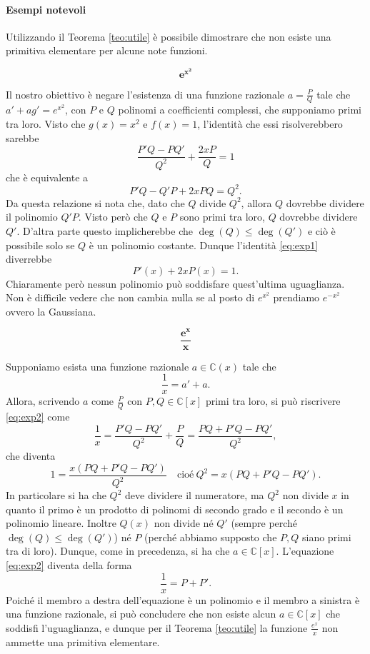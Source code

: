 \documentclass[10pt,oneside]{article}
\theoremstyle{definition}
\theoremstyle{plain}
\theoremstyle{definition}
\theoremstyle{plain}
\theoremstyle{plain}
\newcommand{\C}{\mathbb{C}}
\begin{document}
\paragraph{Esempi notevoli}

Utilizzando il Teorema \ref{teo:utile} è possibile dimostrare che non esiste una primitiva elementare per alcune note funzioni.


 

\[ \bm{e^{x^2}} \]


Il nostro obiettivo è negare l'esistenza di una funzione razionale $a=\frac{P}{Q}$ tale che $a'+ag'=e^{x^2}$, con $P$ e $Q$ polinomi a coefficienti complessi, che supponiamo primi tra loro. Visto che $g(x)=x^2$ e $f(x)=1$, l'identità che essi risolverebbero sarebbe
\[\frac{P'Q-PQ'}{Q^2}+\frac{2xP}{Q}=1 \]
che è equivalente a 
\begin{equation}\label{eq:exp1}
P'Q-Q'P+2xPQ=Q^2. \end{equation}
Da questa relazione si nota che, dato che $Q$ divide $Q^2$, allora $Q$ dovrebbe dividere il polinomio $Q'P$. Visto però che $Q$ e $P$ sono primi tra loro, $Q$ dovrebbe dividere $Q'$. D'altra parte questo implicherebbe che $\deg(Q)\leq\deg(Q')$ e ciò è possibile solo se $Q$ è un polinomio costante. Dunque l'identità \eqref{eq:exp1} diverrebbe
\[P'(x)+2xP(x)=1. \]
Chiaramente però nessun polinomio può soddisfare quest'ultima uguaglianza.
Non è difficile vedere che non cambia nulla se al posto di $e^{x^2}$ prendiamo $e^{-x^2}$ ovvero la Gaussiana.


\[ \bm{\frac{e^x}{x}} \]

Supponiamo esista una funzione razionale $a \in \C(x)$ tale che
\begin{equation}\label{eq:exp2}
    \frac{1}{x}=a'+a .
\end{equation} 
Allora, scrivendo $a$ come $\frac{P}{Q}$ con $P,Q \in \C[x]$ primi tra loro, si può riscrivere \eqref{eq:exp2} come
\[\frac{1}{x}= \frac{P'Q-PQ'}{Q^2}+\frac{P}{Q}= \frac{PQ+P'Q-PQ'}{Q^2}, \]
che diventa
\[ 1 = \frac{x(PQ+P'Q-PQ')}{Q^2} \quad \text{cioé} \ Q^2= x(PQ+P'Q-PQ') . \]
In particolare si ha che $Q^2$ deve dividere il numeratore, ma $Q^2$ non divide $x$ in quanto il primo è un prodotto di polinomi di secondo grado e il secondo è un polinomio lineare. Inoltre $Q(x)$ non divide né $Q'$ (sempre perché $\deg(Q)\le \deg(Q') $) né $P$ (perché abbiamo supposto che $P,Q$ siano primi tra di loro). Dunque, come in precedenza, si ha che $a \in \C[x]$. L'equazione \eqref{eq:exp2}  diventa della forma
\[\frac{1}{x}=P+P'. \]
Poiché il membro a destra dell'equazione è un polinomio e il membro a sinistra è una funzione razionale, si può concludere che non esiste alcun $a \in \C[x]$ che soddisfi l'uguaglianza, e dunque per il Teorema \ref{teo:utile} la funzione $\frac{e^x}{x}$ non ammette una primitiva elementare.
\end{document}
